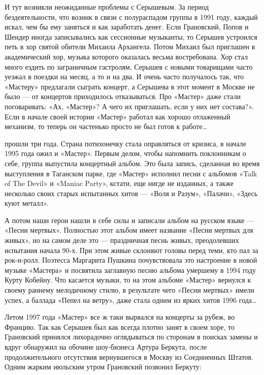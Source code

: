 \documentclass[16pt,a5paper]{book}
\begin{document}
И тут возникли неожиданные проблемы с Серышевым. За период бездеятельности, что возник в связи с полураспадом группы в
1991 году, каждый искал, чем бы ему заняться и как заработать денег. Если Грановский, Попов и Шендер иногда записывались
как сессионные музыканты, то Серышев устроился петь в хор святой обители Михаила Архангела. Потом Михаил был приглашен в
академический хор, музыка которого оказалась весьма востребована. Хор стал много ездить по заграничным гастролям,
Серышев с новыми товарищами часто уезжал в поездки на месяц, а то и на два. И очень часто получалось так, что «Мастеру»
предлагали сыграть концерт, а Серышева в этот момент в Москве не было — от концертов приходилось отказываться. Про
«Мастер» даже стали поговаривать: «Ах, «Мастер»? А чего их приглашать, если у них нет состава?». Если в начале своей
истории «Мастер» работал как хорошо отлаженный механизм, то теперь он частенько просто не был готов к работе\ldots

 прошли три года. Страна потихонечку стала оправляться от кризиса, в начале 1995 года ожил и «Мастер». Первым
делом, чтобы напомнить поклонникам о себе, группа выпустила концертный альбом. Это была запись, сделанная во время
выступления в Таганском парке, где «Мастер» исполнил песни с альбомов «Talk of The Devil» и «Maniac Party», кстати, еще
нигде не изданных, а также несколько своих старых испытанных хитов — «Воля и Разум», «Палачи», «Здесь куют металл».

А потом наши герои нашли в себе силы и записали альбом на русском языке — «Песни мертвых». Полностью этот альбом имеет
название «Песни мертвых для живых», но на самом деле это — праздничная песнь живых, преодолевших испытания начала 90-х.
При этом живые склоняют головы перед теми, кто пал за рок-н-ролл. Поэтесса Маргарита Пушкина почувствовала это
настроение в новой музыке «Мастера» и посвятила заглавную песню альбома умершему в 1994 году Курту Кобейну. Что касается
музыки, то на этом альбоме «Мастер» вернулся к своему раннему мелодичному стилю, в результате чего «Песни мертвых» имели
успех, а баллада «Пепел на ветру», даже стала одним из ярких хитов 1996 года\ldots

Летом 1997 года «Мастер» все ж таки вырвался на концерты за рубеж, во Францию. Так как Серышев был как всегда плотно
занят в своем хоре, то Грановский принялся лихорадочно оглядываться по сторонам в поисках замены и вдруг обнаружил на
обочине шоу-бизнеса Артура Беркута, после продолжительного отсутствия вернувшегося в Москву из Соединенных Штатов. Одним
жарким июльским утром Грановский позвонил Беркуту:
\end{document}
